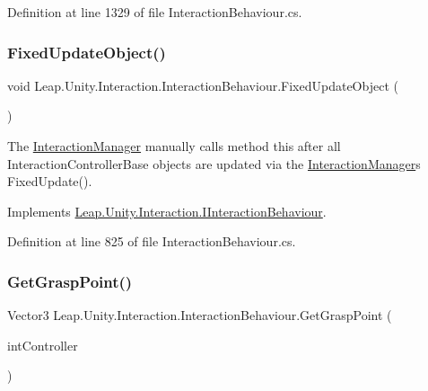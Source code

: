 Definition at line 1329 of file Interaction\+Behaviour.\+cs.

\mbox{\label{class_leap_1_1_unity_1_1_interaction_1_1_interaction_behaviour_a68ff3dbe15847dceb75b97544e634a94}} 
\subsubsection{\texorpdfstring{FixedUpdateObject()}{FixedUpdateObject()}}
{\footnotesize\ttfamily void Leap.\+Unity.\+Interaction.\+Interaction\+Behaviour.\+Fixed\+Update\+Object (\begin{DoxyParamCaption}{ }\end{DoxyParamCaption})}



The \mbox{\hyperlink{class_leap_1_1_unity_1_1_interaction_1_1_interaction_manager}{Interaction\+Manager}} manually calls method this after all Interaction\+Controller\+Base objects are updated via the \mbox{\hyperlink{class_leap_1_1_unity_1_1_interaction_1_1_interaction_manager}{Interaction\+Manager}}\textquotesingle{}s Fixed\+Update(). 



Implements \mbox{\hyperlink{interface_leap_1_1_unity_1_1_interaction_1_1_i_interaction_behaviour_ad2232cd9cc106d1077778fab592f270d}{Leap.\+Unity.\+Interaction.\+I\+Interaction\+Behaviour}}.



Definition at line 825 of file Interaction\+Behaviour.\+cs.

\mbox{\label{class_leap_1_1_unity_1_1_interaction_1_1_interaction_behaviour_ac379f3f2782ecefa91d14e2f0007521a}} 
\subsubsection{\texorpdfstring{GetGraspPoint()}{GetGraspPoint()}}
{\footnotesize\ttfamily Vector3 Leap.\+Unity.\+Interaction.\+Interaction\+Behaviour.\+Get\+Grasp\+Point (\begin{DoxyParamCaption}\item[{\mbox{\hyperlink{class_leap_1_1_unity_1_1_interaction_1_1_interaction_controller}{Interaction\+Controller}}}]{int\+Controller }\end{DoxyParamCaption})}



